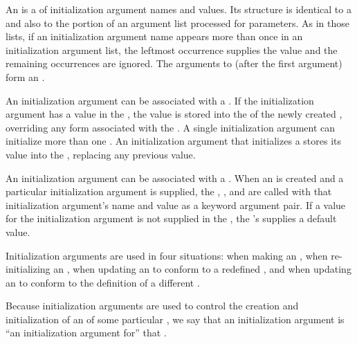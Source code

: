 An  is a
 of
initialization argument names and values.
Its structure is identical
to a  and also 
to the portion of an argument list
processed for  parameters.
As in those lists,
if an initialization
argument name appears more than once in an initialization argument list,
the leftmost occurrence supplies the value and the remaining occurrences
are ignored.  The arguments to  (after the first
argument) form an .

An initialization argument can be associated with a .  If
the initialization argument has a value in the , the value is stored into the  of the newly
created , overriding any  form associated
with the .  A single initialization argument can initialize
more than one .  An initialization argument that initializes
a  stores its value into the ,
replacing any previous value.

An initialization argument can be associated with a .  When
an  is created and a particular initialization argument is
supplied, the  ,
, and  are called
with that initialization argument's name and value as a keyword argument
pair.  If a value for the initialization argument is not supplied in the
, the 's 
 supplies a default value.

Initialization arguments are used in four situations: when making an
, when re-initializing an , when updating
an  to conform to a redefined , and when
updating an  to conform to the definition of a different
.

Because initialization arguments are used to control the creation and
initialization of an  of some particular ,
we say that an initialization argument is
``an initialization argument for'' that .

